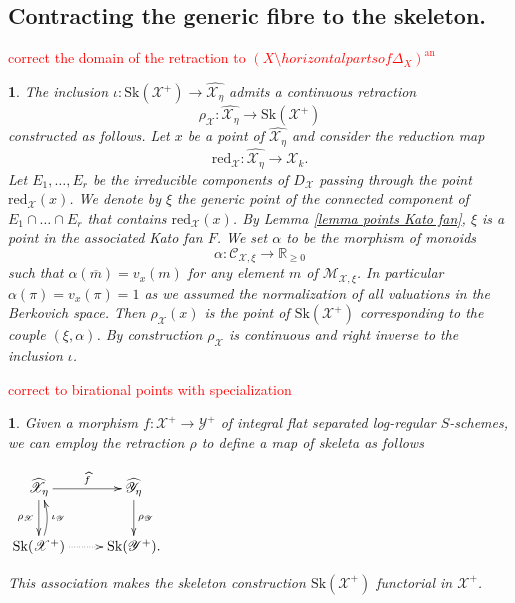 \documentclass{amsart}%
\numberwithin{equation}{subsection}
\theoremstyle{plain2}
\theoremstyle{definition2}
\theoremstyle{stepstyle}
\theoremstyle{point}
\theoremstyle{subpoint}
\newtheorem{subpoint}[equation]{}%
\newcommand{\spa}[1]{\begin{subpoint}#1\end{subpoint}}           %
\newcommand{\R}{\ensuremath{\mathbb{R}}}
\newcommand{\cX}{\ensuremath{\mathscr{X}}}
\newcommand{\caM}{\ensuremath{\mathcal{M}}}
\newcommand{\caC}{\ensuremath{\mathcal{C}}}
\newcommand{\cY}{\ensuremath{\mathscr{Y}}}
\renewcommand{\R}{\ensuremath{\mathbb{R}}}
\renewcommand{\cY}{\ensuremath{\mathscr{Y}}}
\newcommand{\redu}{\mathrm{red}}
\newcommand{\an}{\mathrm{an}}
\newcommand{\Sk}{\mathrm{Sk}}
\begin{document}
\subsection{Contracting the generic fibre to the skeleton.}
\textcolor{red}{correct the domain of the retraction to $(X \setminus horizontal parts of \Delta_X)^\an$}
\spa{The inclusion $\iota: \Sk(\cX^+) \rightarrow \widehat{\cX_{\eta}}$ admits a continuous retraction $$\rho_\cX: \widehat{\cX_{\eta}} \rightarrow \Sk(\cX^+)$$ constructed as follows. Let $x$ be a point of $\widehat{\cX_{\eta}}$ and consider the reduction map $$\redu_{\cX}:\widehat{\cX_{\eta}} \rightarrow \cX_k.$$ Let $E_1, \ldots, E_r$ be the irreducible components of $D_\cX$ passing through the point $\redu_\cX(x)$. We denote by $\xi$ the generic point of the connected component of $E_1 \cap \ldots \cap E_r$ that contains $\redu_\cX(x)$. By Lemma \ref{lemma points Kato fan}, $\xi$ is a point in the associated Kato fan $F$. We set $\alpha$ to be the morphism of monoids $$\alpha: \caC_{\cX,\xi} \rightarrow \R_{\geqslant 0 }$$ such that $\alpha(\overline{m}) = v_x(m)$ for any element $m$ of $\caM_{\cX,\xi}$. In particular $\alpha(\pi)= v_x(\pi)=1$ as we assumed the normalization of all valuations in the Berkovich space. Then $\rho_\cX(x)$ is the point of $\Sk(\cX^+)$ corresponding to the couple $(\xi,\alpha)$. By construction $\rho_\cX$ is continuous and right inverse to the inclusion $\iota$. 
}
\textcolor{red}{correct to birational points with specialization}
\spa{Given a morphism $f: \cX^+ \rightarrow \cY^+$ of integral flat separated log-regular $S$-schemes, we can employ the retraction $\rho$ to define a map of skeleta as follows
\begin{center}
$\begin{gathered}
\xymatrixcolsep{2pc} \xymatrix{
 \widehat{\cX_{\eta}} \ar[r]^-{\widehat{f}} \ar[d]_{\rho_\cX} & \widehat{\cY_{\eta}} \ar[d]^{\rho_\cY}\\
  \Sk(\cX^+) \ar@{.>}[r]^{} \ar@/_/[u]_-{\iota_\cY}  & \Sk(\cY^+).
}
\end{gathered}$\end{center} This association makes the skeleton construction $\Sk(\cX^+)$ functorial in $\cX^+$.
}
\end{document}
